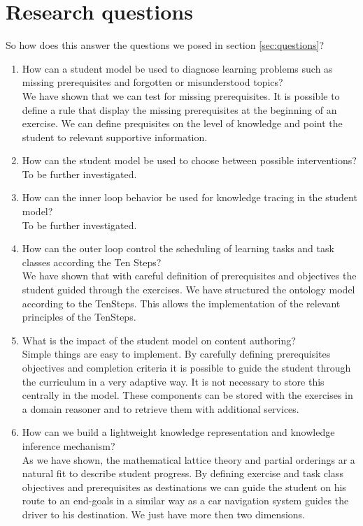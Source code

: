 \section{Research questions}
So how does this answer the questions we posed in section \ref{sec:questions}?

\begin{enumerate}[Q1.]
\item How can a student model be used to diagnose learning problems such as missing prerequisites and forgotten or misunderstood topics?\\
We have shown that we can test for missing prerequisites.
It is possible to define a rule that display the missing prerequisites at the beginning of an exercise.
We can define prequisites on the level of knowledge and point the student to relevant supportive information.

\item How can the student model be used to choose between possible interventions?\\
To be further investigated.

\item How can the inner loop behavior be used for knowledge tracing in the student model?\\
To be further investigated.

\item How can the outer loop control the scheduling of learning tasks and task classes according the Ten Steps?\\
We have shown that with careful definition of prerequisites and objectives the student guided through the exercises.
We have structured the ontology model according to the TenSteps. 
This allows the implementation of the relevant principles of the TenSteps.

\item What is the impact of the student model on content authoring?\\
Simple things are easy to implement. 
By carefully defining prerequisites objectives and completion criteria it is possible to guide the student
through the curriculum in a very adaptive way.
It is not necessary to store this centrally in the model. 
These components can be stored with the exercises in a domain reasoner and to retrieve them with additional services.

\item How can we build a lightweight knowledge representation and knowledge inference mechanism?\\
As we have shown, the mathematical lattice theory and partial orderings ar a natural fit to describe student progress.
By defining exercise and task class objectives and prerequisites as destinations we can guide 
the student on his route to an end-goals in a similar way as a car navigation system guides the driver to his destination.
We just have more then two dimensions.

\end{enumerate}

